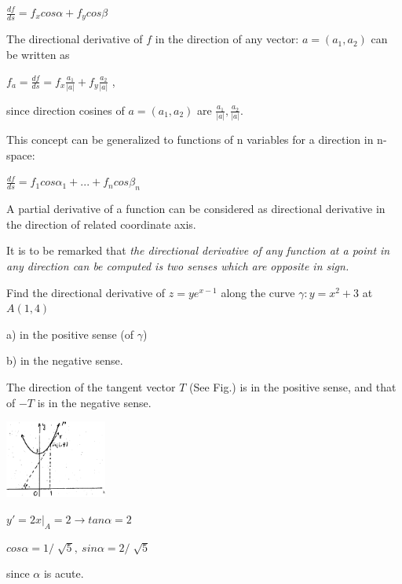 \documentclass[11pt]{amsbook}
\begin{document}
	
    \begin{center}
	$\frac{df}{ds} = f_xcos\alpha + f_ycos\beta$
    \end{center}

The directional derivative of $f$ in the direction of any vector: $a = (a_1, a_2)$ can be written as

	\begin{center}
	$f_a = \frac{df}{ds} = f_x \frac{a_1}{|a|} + f_y \frac{a_2}{|a|}$ ,
    \end{center}
    
since direction cosines of $a = (a_1, a_2)$ are $\frac{a_1}{|a|}, \frac{a_2}{|a|}$.

This concept can be generalized to functions of n variables for a direction in n-space:

    \begin{center}
	$\frac{df}{ds} = f_1cos\alpha_1 + ... + f_ncos\beta_n$
    \end{center}
    
A partial derivative of a function can be considered as directional derivative in the direction of related coordinate axis.

It is to be remarked that \textit{the directional derivative of any function at a point in any direction can be computed is two senses which are opposite in sign.}

	\begin{exmp}
	Find the directional derivative of $z = y e^{x-1}$ along the curve $\gamma: y = x^2 + 3$ at $A(1, 4)$
    
    a) in the positive sense (of $\gamma$)

    b) in the negative sense.
	\end{exmp}
    
    \begin{hSolution}
    The direction of the tangent vector $T$ (See Fig.) is in the positive sense, and that of $-T$ is in the negative sense.
    
      \begin{center}
      \includegraphics[width=0.25\textwidth]{images/b2p2-296-fig01}

      $y' = 2x |_A = 2 \to tan\alpha = 2$

      $cos\alpha = 1 / \sqrt[]{5}, \ sin\alpha = 2 / \sqrt[]{5}$
      \end{center}
      
    since $\alpha$ is acute. 
    \end{hSolution}	%
\end{document}
